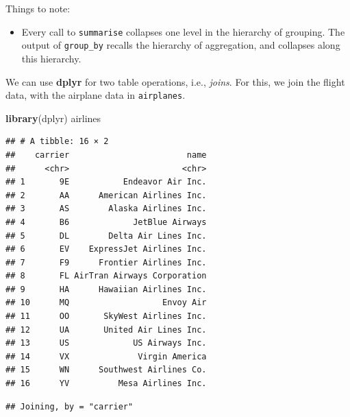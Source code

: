 \documentclass[]{book}
\newenvironment{Shaded}{\begin{snugshade}}{\end{snugshade}}
\newcommand{\KeywordTok}[1]{\textcolor[rgb]{0.13,0.29,0.53}{\textbf{{#1}}}}
\newcommand{\StringTok}[1]{\textcolor[rgb]{0.31,0.60,0.02}{{#1}}}
\newcommand{\CommentTok}[1]{\textcolor[rgb]{0.56,0.35,0.01}{\textit{{#1}}}}
\newcommand{\NormalTok}[1]{{#1}}
\providecommand{\tightlist}{%
  \setlength{\itemsep}{0pt}\setlength{\parskip}{0pt}}
\theoremstyle{definition}
\theoremstyle{definition}
\theoremstyle{remark}
\begin{document}
Things to note:

\begin{itemize}
\tightlist
\item
  Every call to \texttt{summarise} collapses one level in the hierarchy
  of grouping. The output of \texttt{group\_by} recalls the hierarchy of
  aggregation, and collapses along this hierarchy.
\end{itemize}

We can use \textbf{dplyr} for two table operations, i.e., \emph{joins}.
For this, we join the flight data, with the airplane data in
\texttt{airplanes}.

\begin{Shaded}
\begin{Highlighting}[]
\KeywordTok{library}\NormalTok{(dplyr) }
\NormalTok{airlines  }
\end{Highlighting}
\end{Shaded}

\begin{verbatim}
## # A tibble: 16 × 2
##    carrier                        name
##      <chr>                       <chr>
## 1       9E           Endeavor Air Inc.
## 2       AA      American Airlines Inc.
## 3       AS        Alaska Airlines Inc.
## 4       B6             JetBlue Airways
## 5       DL        Delta Air Lines Inc.
## 6       EV    ExpressJet Airlines Inc.
## 7       F9      Frontier Airlines Inc.
## 8       FL AirTran Airways Corporation
## 9       HA      Hawaiian Airlines Inc.
## 10      MQ                   Envoy Air
## 11      OO       SkyWest Airlines Inc.
## 12      UA       United Air Lines Inc.
## 13      US             US Airways Inc.
## 14      VX              Virgin America
## 15      WN      Southwest Airlines Co.
## 16      YV          Mesa Airlines Inc.
\end{verbatim}

\begin{Shaded}
\end{Shaded}

\begin{verbatim}
## Joining, by = "carrier"
\end{verbatim}
\end{document}
